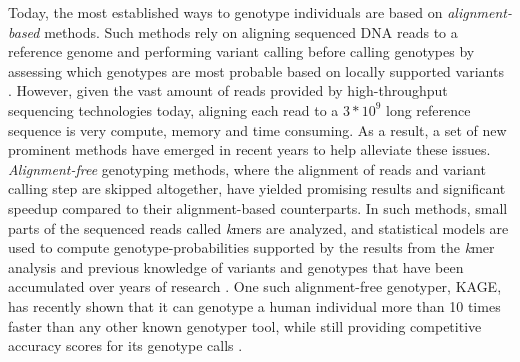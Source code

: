 Today, the most established ways to genotype individuals are based on \textit{alignment-based} methods.
Such methods rely on aligning sequenced DNA reads to a reference genome and performing variant calling before calling genotypes by assessing which genotypes are most probable based on locally supported variants \cite{gatk}.
However, given the vast amount of reads provided by high-throughput sequencing technologies today, aligning each read to a $3*10^9$ long reference sequence is very compute, memory and time consuming.
As a result, a set of new prominent methods have emerged in recent years to help alleviate these issues.
\textit{Alignment-free} genotyping methods, where the alignment of reads and variant calling step are skipped altogether, have yielded promising results and significant speedup compared to their alignment-based counterparts.
In such methods, small parts of the sequenced reads called \textit{k}mers are analyzed, and statistical models are used to compute genotype-probabilities supported by the results from the \textit{k}mer analysis and previous knowledge of variants and genotypes that have been accumulated over years of research \cite{kage,malva,1000_genomes_project}.
One such alignment-free genotyper, KAGE, has recently shown that it can genotype a human individual more than 10 times faster than any other known genotyper tool, while still providing competitive accuracy scores for its genotype calls \cite{kage}.

